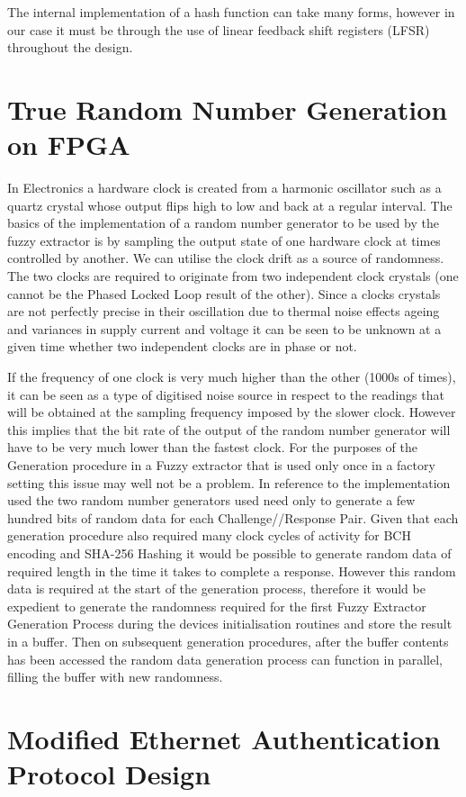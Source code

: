 The internal implementation of a hash function can take many forms, however in
our case it must be through the use of linear feedback shift registers (LFSR)
throughout the design.

\section{True Random Number Generation on FPGA}
In Electronics a hardware clock is created from a harmonic oscillator such as a
quartz crystal whose output flips high to low and back at a regular interval.
The basics of the implementation of a random number generator to be used by the
fuzzy extractor is by sampling the output state of one hardware clock at times
controlled by another. We can utilise the clock drift as a source of randomness.
The two clocks are required to originate from two independent clock crystals
(one cannot be the Phased Locked Loop result of the other). Since a clocks
crystals are not perfectly precise in their oscillation due to thermal noise
effects ageing and variances in supply current and voltage it can be seen to be
unknown at a given time whether two independent clocks are in phase or not. 

If the frequency of one clock is very much higher than the other (1000s of
times), it can be seen as a type of digitised noise source in respect to the
readings that will be obtained at the sampling frequency imposed by the slower
clock.
However this implies that the bit rate of the output of the random number
generator will have to be very much lower than the fastest clock.
For the purposes of the Generation procedure in a Fuzzy extractor that is used
only once in a factory setting this issue may well not be a problem.
In reference to the implementation used the two random number generators used
need only to generate a few hundred bits of random data for each
Challenge//Response Pair.
Given that each generation procedure also required many clock cycles of activity
for BCH encoding and SHA-256 Hashing it would be possible to generate random
data of required length in the time it takes to complete a response.
However this random data is required at the start of the generation process,
therefore it would be expedient to generate the randomness required for the
first Fuzzy Extractor Generation Process during the devices initialisation
routines and store the result in a buffer. Then on subsequent generation
procedures, after the buffer contents has been accessed the random data
generation process can function in parallel, filling the buffer with new
randomness.

\section{Modified Ethernet Authentication Protocol Design}